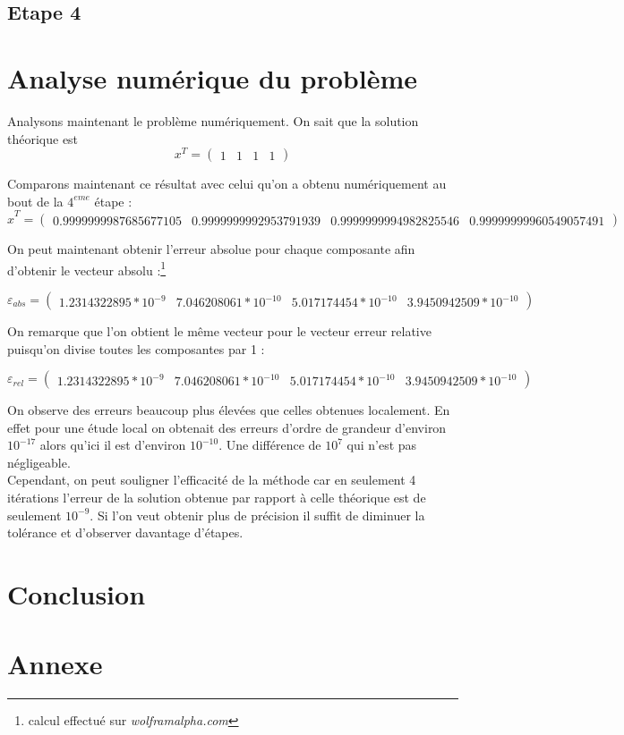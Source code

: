 \documentclass[12,french]{report}
\begin{document}
\section{Etape 4}

\chapter{Analyse numérique du problème} %

Analysons maintenant le problème numériquement. On sait que la solution théorique est
$$x^T=\left(\begin{array}{cccc}
1 & 1 & 1 & 1\end{array}\right)$$

Comparons maintenant ce résultat avec celui qu'on a obtenu numériquement au bout de la $4^{eme}$ étape :
$$\hat{x}^T=\left(\begin{array}{cccc}
0.9999999987685677105 & 0.9999999992953791939 & 0.9999999994982825546 & 0.99999999960549057491\end{array}\right)$$\vspace{0cm}

On peut maintenant obtenir l'erreur absolue pour chaque composante afin d'obtenir le vecteur absolu :\footnote{calcul effectué sur \textit{wolframalpha.com}}

$$\varepsilon_{abs}=\left(\begin{array}{cccc}
1.2314322895*10^{-9} & 7.046208061*10^{-10} & 5.017174454*10^{-10} & 3.9450942509*10^{-10} \end{array}\right)$$\vspace{0cm}

On remarque que l'on obtient le même vecteur pour le vecteur erreur relative puisqu'on divise toutes les composantes par 1 :

$$\varepsilon_{rel}=\left(\begin{array}{cccc}
1.2314322895*10^{-9} & 7.046208061*10^{-10} & 5.017174454*10^{-10} & 3.9450942509*10^{-10} \end{array}\right)$$

On observe des erreurs beaucoup plus élevées que celles obtenues localement. En effet pour une étude local on obtenait des erreurs d'ordre de grandeur d'environ $10^{-17}$ alors qu'ici il est d'environ $10^{-10}$. Une différence de $10^{7}$ qui n'est pas négligeable.\\

Cependant, on peut souligner l'efficacité de la méthode car en seulement 4 itérations l'erreur de la solution obtenue par rapport à celle théorique est de seulement $10^{-9}$. Si l'on veut obtenir plus de précision il suffit de diminuer la tolérance et d'observer davantage d'étapes.





\chapter*{Conclusion} %

\chapter*{Annexe}
\end{document}
